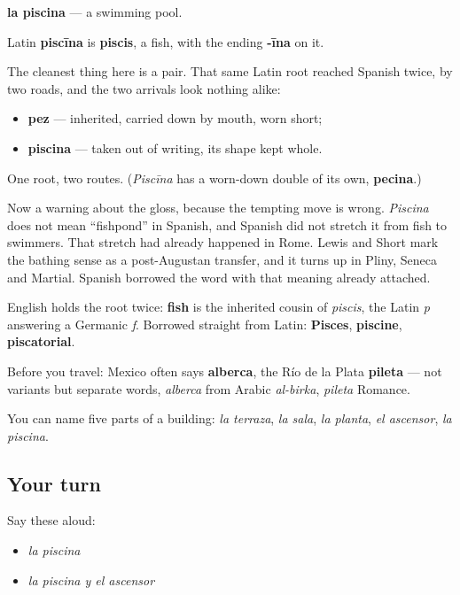 \begin{cousinweb}
\textbf{la piscina} — a swimming pool.

Latin \textbf{piscīna} is \textbf{piscis}, a fish, with the ending \textbf{-īna} on it.

The cleanest thing here is a pair. That same Latin root reached Spanish twice, by two roads, and the two arrivals look nothing alike:

\begin{itemize}
\raggedright
  \item \textbf{pez} — inherited, carried down by mouth, worn short;
  \item \textbf{piscina} — taken out of writing, its shape kept whole.
\end{itemize}

One root, two routes. (\emph{Piscīna} has a worn-down double of its own, \textbf{pecina}.)

Now a warning about the gloss, because the tempting move is wrong. \emph{Piscina} does not mean \textquotedblleft{}fishpond\textquotedblright{} in Spanish, and Spanish did not stretch it from fish to swimmers. That stretch had already happened in Rome. Lewis and Short mark the bathing sense as a post-Augustan transfer, and it turns up in Pliny, Seneca and Martial. Spanish borrowed the word with that meaning already attached.

English holds the root twice: \textbf{fish} is the inherited cousin of \emph{piscis}, the Latin \emph{p} answering a Germanic \emph{f}. Borrowed straight from Latin: \textbf{Pisces}, \textbf{piscine}, \textbf{piscatorial}.

Before you travel: Mexico often says \textbf{alberca}, the Río de la Plata \textbf{pileta} — not variants but separate words, \emph{alberca} from Arabic \emph{al-birka}, \emph{pileta} Romance.
\end{cousinweb}

\begin{grammarlens}[title={What you've built}]
You can name five parts of a building: \emph{la terraza}, \emph{la sala}, \emph{la planta}, \emph{el ascensor}, \emph{la piscina}.
\end{grammarlens}

\subsection*{Your turn}
Say these aloud:

\begin{itemize}
\raggedright
  \item \emph{la piscina}
  \item \emph{la piscina y el ascensor}
\end{itemize}

